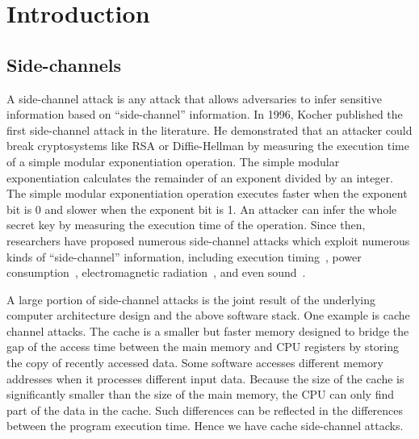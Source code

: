
\chapter{Introduction} \label{chapter1}
\section{Side-channels}
A side-channel attack is any attack that allows adversaries to infer sensitive information based on ``side-channel'' information. In 1996, Kocher published the first side-channel attack in the literature. He demonstrated that an attacker could break cryptosystems like RSA or Diffie-Hellman by measuring the execution time of a simple modular exponentiation operation. The simple modular exponentiation calculates the remainder of an exponent divided by an integer.  The simple modular exponentiation operation executes faster when the exponent bit is 0 and slower when the exponent bit is 1. An attacker can infer the whole secret key by measuring the execution time of the operation. Since then, researchers have proposed numerous side-channel attacks which exploit numerous kinds of ``side-channel'' information, including execution timing~\cite{184415,disselkoen2017prime+}, power consumption~\cite{kar20178}, electromagnetic radiation~\cite{agrawal2002side,217605}, and even sound~\cite{chari1999towards}. 

A large portion of side-channel attacks is the joint result of the underlying computer architecture design and the above software stack.  One example is cache channel attacks. The cache is a smaller but faster memory designed to bridge the gap of the access time between the main memory and CPU registers by storing the copy of recently accessed data. Some software accesses different memory addresses when it processes different input data. Because the size of the cache is significantly smaller than the size of the main memory, the CPU can only find part of the data in the cache. Such differences can be reflected in the differences between the program execution time. Hence we have cache side-channel attacks.


